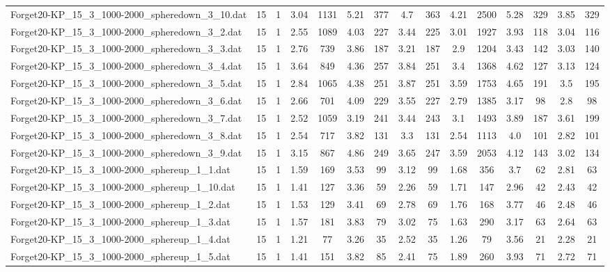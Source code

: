 \begin{table}[!ht]
{\begin{tabular}{lcccccccccccccc}
Forget20-KP\_15\_3\_1000-2000\_spheredown\_3\_10.dat & 15 & 1 & 3.04 & 1131 & 5.21 & 377 & 4.7 & 363 & 4.21 & 2500 & 5.28 & 329 & 3.85 & 329 \\
Forget20-KP\_15\_3\_1000-2000\_spheredown\_3\_2.dat & 15 & 1 & 2.55 & 1089 & 4.03 & 227 & 3.44 & 225 & 3.01 & 1927 & 3.93 & 118 & 3.04 & 116 \\
Forget20-KP\_15\_3\_1000-2000\_spheredown\_3\_3.dat & 15 & 1 & 2.76 & 739 & 3.86 & 187 & 3.21 & 187 & 2.9 & 1204 & 3.43 & 142 & 3.03 & 140 \\
Forget20-KP\_15\_3\_1000-2000\_spheredown\_3\_4.dat & 15 & 1 & 3.64 & 849 & 4.36 & 257 & 3.84 & 251 & 3.4 & 1368 & 4.62 & 127 & 3.13 & 124 \\
Forget20-KP\_15\_3\_1000-2000\_spheredown\_3\_5.dat & 15 & 1 & 2.84 & 1065 & 4.38 & 251 & 3.87 & 251 & 3.59 & 1753 & 4.65 & 191 & 3.5 & 195 \\
Forget20-KP\_15\_3\_1000-2000\_spheredown\_3\_6.dat & 15 & 1 & 2.66 & 701 & 4.09 & 229 & 3.55 & 227 & 2.79 & 1385 & 3.17 & 98 & 2.8 & 98 \\
Forget20-KP\_15\_3\_1000-2000\_spheredown\_3\_7.dat & 15 & 1 & 2.52 & 1059 & 3.19 & 241 & 3.44 & 243 & 3.1 & 1493 & 3.89 & 187 & 3.61 & 199 \\
Forget20-KP\_15\_3\_1000-2000\_spheredown\_3\_8.dat & 15 & 1 & 2.54 & 717 & 3.82 & 131 & 3.3 & 131 & 2.54 & 1113 & 4.0 & 101 & 2.82 & 101 \\
Forget20-KP\_15\_3\_1000-2000\_spheredown\_3\_9.dat & 15 & 1 & 3.15 & 867 & 4.86 & 249 & 3.65 & 247 & 3.59 & 2053 & 4.12 & 143 & 3.02 & 134 \\
Forget20-KP\_15\_3\_1000-2000\_sphereup\_1\_1.dat & 15 & 1 & 1.59 & 169 & 3.53 & 99 & 3.12 & 99 & 1.68 & 356 & 3.7 & 62 & 2.81 & 63 \\
Forget20-KP\_15\_3\_1000-2000\_sphereup\_1\_10.dat & 15 & 1 & 1.41 & 127 & 3.36 & 59 & 2.26 & 59 & 1.71 & 147 & 2.96 & 42 & 2.43 & 42 \\
Forget20-KP\_15\_3\_1000-2000\_sphereup\_1\_2.dat & 15 & 1 & 1.53 & 129 & 3.41 & 69 & 2.78 & 69 & 1.76 & 168 & 3.77 & 46 & 2.48 & 46 \\
Forget20-KP\_15\_3\_1000-2000\_sphereup\_1\_3.dat & 15 & 1 & 1.57 & 181 & 3.83 & 79 & 3.02 & 75 & 1.63 & 290 & 3.17 & 63 & 2.64 & 63 \\
Forget20-KP\_15\_3\_1000-2000\_sphereup\_1\_4.dat & 15 & 1 & 1.21 & 77 & 3.26 & 35 & 2.52 & 35 & 1.26 & 79 & 3.56 & 21 & 2.28 & 21 \\
Forget20-KP\_15\_3\_1000-2000\_sphereup\_1\_5.dat & 15 & 1 & 1.41 & 151 & 3.82 & 85 & 2.41 & 75 & 1.89 & 260 & 3.93 & 71 & 2.72 & 71 \\

\end{tabular}}
\end{table}
